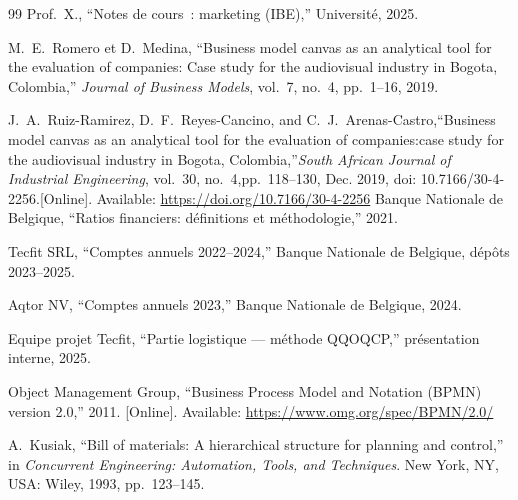 \begin{thebibliography}{99}
Prof.~X., ``Notes de cours~: marketing (IBE),'' Université, 2025.

M.~E.~Romero et D.~Medina, ``Business model canvas as an analytical tool for the evaluation of companies: Case study for the audiovisual industry in Bogota, Colombia,'' \emph{Journal of Business Models}, vol.~7, no.~4, pp.~1--16, 2019.

J.~A.~Ruiz-Ramirez, D.~F.~Reyes-Cancino, and C.~J.~Arenas-Castro,``Business model canvas as an analytical tool for the evaluation of companies:case study for the audiovisual industry in Bogota, Colombia,''\emph{South African Journal of Industrial Engineering}, vol.~30, no.~4,pp.~118--130, Dec. 2019, doi: 10.7166/30-4-2256.[Online]. Available: \url{https://doi.org/10.7166/30-4-2256}
Banque Nationale de Belgique, ``Ratios financiers: définitions et méthodologie,'' 2021.

Tecfit SRL, ``Comptes annuels 2022--2024,'' Banque Nationale de Belgique, dépôts 2023--2025.

Aqtor NV, ``Comptes annuels 2023,'' Banque Nationale de Belgique, 2024.

Equipe projet Tecfit, ``Partie logistique --- méthode QQOQCP,'' présentation interne, 2025.

Object Management Group, ``Business Process Model and Notation (BPMN) version 2.0,'' 2011. [Online]. Available: \url{https://www.omg.org/spec/BPMN/2.0/}

A.~Kusiak, ``Bill of materials: A hierarchical structure for planning and control,'' in \emph{Concurrent Engineering: Automation, Tools, and Techniques}. New York, NY, USA: Wiley, 1993, pp.~123--145.
\end{thebibliography}
